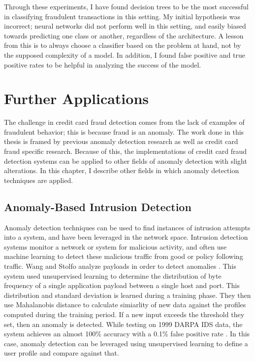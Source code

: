 \documentclass[midd]{thesis}
\begin{document}
Through these experiments, I have found decision trees to be the most successful in classifying fraudulent transactions in this setting. My initial hypothesis was incorrect; neural networks did not perform well in this setting, and easily biased towards predicting one class or another, regardless of the architecture. A lesson from this is to always choose a classifier based on the problem at hand, not by the supposed complexity of a model. In addition, I found false positive and true positive rates to be helpful in analyzing the success of the model.





\pagebreak
\chapter{Further Applications}
\label{sec:future}

The challenge in credit card fraud detection comes from the lack of examples of fraudulent behavior; this is because fraud is an anomaly. The work done in this thesis is framed by previous anomaly detection research as well as credit card fraud specific research. Because of this, the implementations of credit card fraud detection systems can be applied to other fields of anomaly detection with slight alterations. In this chapter, I describe other fields in which anomaly detection techniques are applied.

\section{Anomaly-Based Intrusion Detection}

Anomaly detection techniques can be used to find instances of intrusion attempts into a system, and have been leveraged in the network space. Intrusion detection systems monitor a network or system for malicious activity, and often use machine learning to detect these malicious traffic from good or policy following traffic. Wang and Stolfo analyze payloads in order to detect anomalies \cite{Wang2004}. This system used unsupervised learning to determine the distribution of byte frequency of a single application payload between a single host and port. This distribution and standard deviation is learned during a training phase. They then use Mahalanobis distance to calculate simiarlity of new data against the profiles computed during the training period. If a new input exceeds the threshold they set, then an anomaly is detected. While testing on 1999 DARPA IDS data, the system achieves an almost 100\% accuracy with a 0.1\% false positive rate \cite{Wang2004}. In this case, anomaly detection can be leveraged using unsupervised learning to define a user profile and compare against that.    
\end{document}
